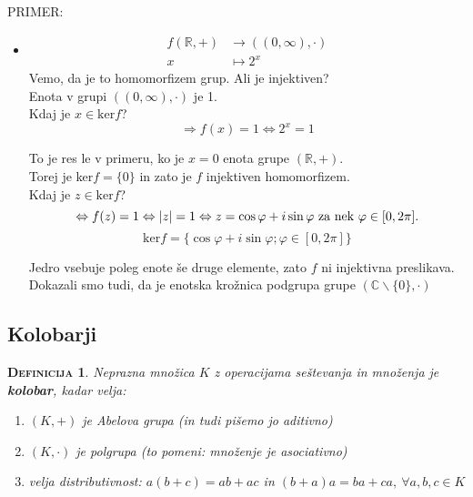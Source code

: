 \documentclass[a4paper,12pt]{article}
\newtheorem*{definicija}{\textsc{Definicija}}
\begin{document}
\noindent PRIMER: 
\begin{itemize}
\item 
\begin{align*}
f(\mathbb{R},+)& \to((0,\infty),\cdot)\\
x & \mapsto 2^x
\end{align*}
Vemo, da je to homomorfizem grup. Ali je injektiven? \\

Enota v grupi $((0,\infty),\cdot)$ je 1. \\

\noindent Kdaj je $x\in \text{ker}f$? 
\begin{equation*}
\Rightarrow f(x)=1 \Leftrightarrow 2^x=1
\end{equation*}

To je res le v primeru, ko je $x=0$ enota grupe $(\mathbb{R},+)$. \\

Torej je ker$f=\{0\}$ in zato je $f$ injektiven homomorfizem.\\

Kdaj je $z\in\text{ker}f$? 
\begin{equation*}
\Leftrightarrow f(z)=1\Leftrightarrow |z|=1 \Leftrightarrow z=\cos\varphi + i\sin\varphi~\text{za nek}~\varphi\in[0,2\pi].\\
\end{equation*}
\begin{equation*}
\text{ker}f=\{\cos\varphi+i\sin\varphi;\varphi\in[0,2\pi]\}
\end{equation*}


Jedro vsebuje poleg enote še druge elemente, zato $f$ ni injektivna preslikava. \\

Dokazali smo tudi, da je enotska krožnica podgrupa grupe $(\mathbb{C}\backslash\{0\},\cdot)$

\end{itemize}

\newpage

\subsection{Kolobarji}

\begin{definicija}
Neprazna množica $K$ z operacijama seštevanja in množenja je \textbf{kolobar}, kadar velja:
\begin{enumerate}
\item[1)] $(K,+)$ je Abelova grupa (in tudi pišemo jo aditivno)
\item[2)] $(K,\cdot)$ je polgrupa (to pomeni: množenje je asociativno)
\item[3)] velja \emph{distributivnost}: $a(b+c)=ab+ac$ in $(b+a)a=ba+ca,~\forall a,b,c\in K$\\
\end{enumerate}
\end{definicija}
\end{document}
